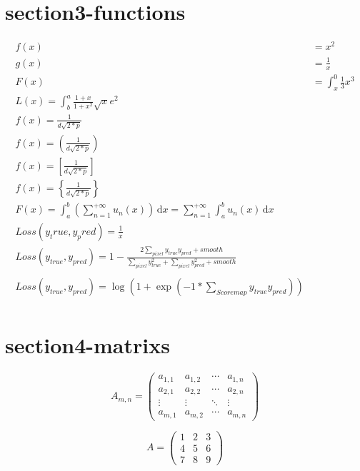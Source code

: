 \documentclass{article}
\begin{document}
\section{section3-functions}
\begin{align}
f(x)  &= x^2 \\
g(x) &= \frac{1}{x}\\
F(x) &= \int^0_x \frac{1}{3}x^3\\
L(x) = \int^a_b \frac{1+x}{1+x^2}\sqrt{x}e^2\\
f(x) = \frac{1}{d \sqrt{2*p}}\\
f(x) = \left( \frac{1}{d \sqrt{2*p}} \right)\\
f(x) = \left[ \frac{1}{d \sqrt{2*p}} \right]\\
f(x) = \left\{ \frac{1}{d \sqrt{2*p}} \right\}\\
F(x) = \int_{a}^{b}\left( \sum_{n=1}^{+\infty}u_{n}(x) \right)\,\mathrm{d}x
    =\sum_{n=1}^{+\infty}\int_{a}^{b}u_{n}(x)\,\mathrm{d}x \\
Loss(y_true, y_pred) = \frac{1}{x}\\
Loss(y_{true}, y_{pred}) = 1 - \frac{2\sum_{pixel}y_{true}y_{pred} + smooth }{\sum_{pixel}y_{true}^2 + \sum_{pixel}y_{pred}^2 + smooth}\\
\\
Loss(y_{true}, y_{pred})  = \log(1+\exp(-1 * \sum_{Scoremap}y_{true}y_{pred} ))\\
\end{align}


\section{section4-matrixs}
\begin{equation}
A_{m,n} = 
\begin{pmatrix}
a_{1,1} & a_{1,2} & \cdots & a_{1,n} \\
a_{2,1} & a_{2,2} & \cdots & a_{2,n} \\
\vdots  & \vdots  & \ddots & \vdots  \\
a_{m,1} & a_{m,2} & \cdots & a_{m,n} 
\end{pmatrix}
\end{equation}

\begin{equation}
A = 
\begin{pmatrix}
1 & 2 & 3 \\
4 & 5 & 6 \\
7 & 8 & 9
\end{pmatrix}
\end{equation}
\end{document}

